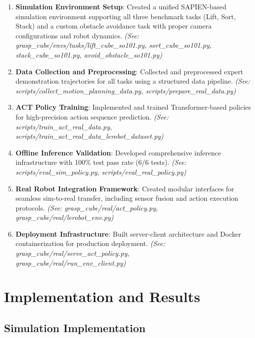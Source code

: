 \documentclass[10pt]{article} %
\begin{document}
\begin{enumerate}
    \item \textbf{Simulation Environment Setup}: Created a unified SAPIEN-based simulation environment supporting all three benchmark tasks (Lift, Sort, Stack) and a custom obstacle avoidance task with proper camera configurations and robot dynamics. \textit{(See: grasp\_cube/envs/tasks/lift\_cube\_so101.py, sort\_cube\_so101.py, stack\_cube\_so101.py, avoid\_obstacle\_so101.py)}
    \item \textbf{Data Collection and Preprocessing}: Collected and preprocessed expert demonstration trajectories for all tasks using a structured data pipeline. \textit{(See: scripts/collect\_motion\_planning\_data.py, scripts/prepare\_real\_data.py)}
    \item \textbf{ACT Policy Training}: Implemented and trained Transformer-based policies \\
    for high-precision action sequence prediction. \textit{(See: scripts/train\_act\_real\_data.py, \\
    scripts/train\_act\_real\_data\_lerobot\_dataset.py)}
    \item \textbf{Offline Inference Validation}: Developed comprehensive inference infrastructure with 100\% test pass rate (6/6 tests). \textit{(See: scripts/eval\_sim\_policy.py, scripts/eval\_real\_policy.py)}
    \item \textbf{Real Robot Integration Framework}: Created modular interfaces for seamless sim-to-real transfer, including sensor fusion and action execution protocols. \textit{(See: grasp\_cube/real/act\_policy.py, grasp\_cube/real/lerobot\_env.py)}
    \item \textbf{Deployment Infrastructure}: Built server-client architecture and Docker \\
    containerization for production deployment. \textit{(See: grasp\_cube/real/serve\_act\_policy.py, \\
    grasp\_cube/real/run\_env\_client.py)}
\end{enumerate}

\section{Implementation and Results}

\subsection{Simulation Implementation}
\end{document}
